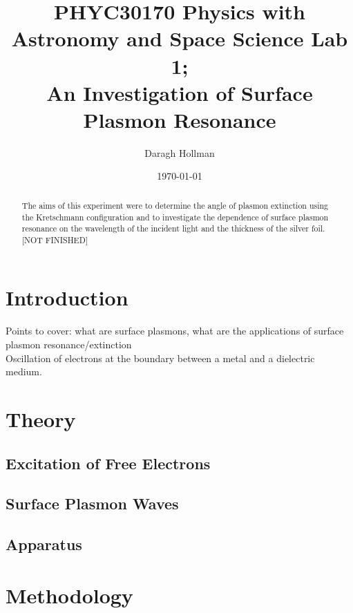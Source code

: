 \documentclass[%
reprint,
amsmath,amssymb,
aps,
]{revtex4-2}
\begin{document}
	
	
	\title{PHYC30170 Physics with Astronomy and Space Science Lab 1;\\An Investigation of Surface Plasmon Resonance}
	
	\author{Daragh Hollman}
	
	\date{\today}
	
	\begin{abstract}
		The aims of this experiment were to determine the angle of plasmon extinction using the Kretschmann configuration and to investigate the dependence of surface plasmon resonance on the wavelength of the incident light and the thickness of the silver foil. [NOT FINISHED]
	\end{abstract}

	\maketitle
	
	\section{Introduction}
		Points to cover: what are surface plasmons, what are the applications of surface plasmon resonance/extinction\\
		
		Oscillation of electrons at the boundary between a metal and a dielectric medium.
	
	\section{Theory}
		\subsection{Excitation of Free Electrons}
			
		
		\subsection{Surface Plasmon Waves}
		
		\subsection{Apparatus}
		
	 
	\section{Methodology}
\end{document}

